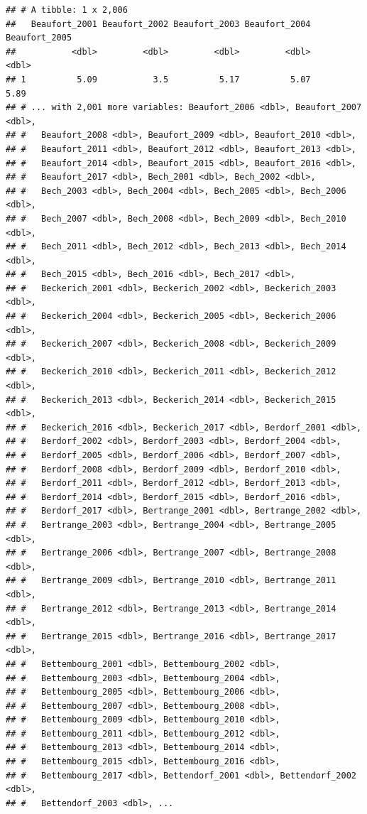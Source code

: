 \documentclass[]{gitbook}
\begin{document}
\begin{verbatim}
## # A tibble: 1 x 2,006
##   Beaufort_2001 Beaufort_2002 Beaufort_2003 Beaufort_2004 Beaufort_2005
##           <dbl>         <dbl>         <dbl>         <dbl>         <dbl>
## 1          5.09           3.5          5.17          5.07          5.89
## # ... with 2,001 more variables: Beaufort_2006 <dbl>, Beaufort_2007 <dbl>,
## #   Beaufort_2008 <dbl>, Beaufort_2009 <dbl>, Beaufort_2010 <dbl>,
## #   Beaufort_2011 <dbl>, Beaufort_2012 <dbl>, Beaufort_2013 <dbl>,
## #   Beaufort_2014 <dbl>, Beaufort_2015 <dbl>, Beaufort_2016 <dbl>,
## #   Beaufort_2017 <dbl>, Bech_2001 <dbl>, Bech_2002 <dbl>,
## #   Bech_2003 <dbl>, Bech_2004 <dbl>, Bech_2005 <dbl>, Bech_2006 <dbl>,
## #   Bech_2007 <dbl>, Bech_2008 <dbl>, Bech_2009 <dbl>, Bech_2010 <dbl>,
## #   Bech_2011 <dbl>, Bech_2012 <dbl>, Bech_2013 <dbl>, Bech_2014 <dbl>,
## #   Bech_2015 <dbl>, Bech_2016 <dbl>, Bech_2017 <dbl>,
## #   Beckerich_2001 <dbl>, Beckerich_2002 <dbl>, Beckerich_2003 <dbl>,
## #   Beckerich_2004 <dbl>, Beckerich_2005 <dbl>, Beckerich_2006 <dbl>,
## #   Beckerich_2007 <dbl>, Beckerich_2008 <dbl>, Beckerich_2009 <dbl>,
## #   Beckerich_2010 <dbl>, Beckerich_2011 <dbl>, Beckerich_2012 <dbl>,
## #   Beckerich_2013 <dbl>, Beckerich_2014 <dbl>, Beckerich_2015 <dbl>,
## #   Beckerich_2016 <dbl>, Beckerich_2017 <dbl>, Berdorf_2001 <dbl>,
## #   Berdorf_2002 <dbl>, Berdorf_2003 <dbl>, Berdorf_2004 <dbl>,
## #   Berdorf_2005 <dbl>, Berdorf_2006 <dbl>, Berdorf_2007 <dbl>,
## #   Berdorf_2008 <dbl>, Berdorf_2009 <dbl>, Berdorf_2010 <dbl>,
## #   Berdorf_2011 <dbl>, Berdorf_2012 <dbl>, Berdorf_2013 <dbl>,
## #   Berdorf_2014 <dbl>, Berdorf_2015 <dbl>, Berdorf_2016 <dbl>,
## #   Berdorf_2017 <dbl>, Bertrange_2001 <dbl>, Bertrange_2002 <dbl>,
## #   Bertrange_2003 <dbl>, Bertrange_2004 <dbl>, Bertrange_2005 <dbl>,
## #   Bertrange_2006 <dbl>, Bertrange_2007 <dbl>, Bertrange_2008 <dbl>,
## #   Bertrange_2009 <dbl>, Bertrange_2010 <dbl>, Bertrange_2011 <dbl>,
## #   Bertrange_2012 <dbl>, Bertrange_2013 <dbl>, Bertrange_2014 <dbl>,
## #   Bertrange_2015 <dbl>, Bertrange_2016 <dbl>, Bertrange_2017 <dbl>,
## #   Bettembourg_2001 <dbl>, Bettembourg_2002 <dbl>,
## #   Bettembourg_2003 <dbl>, Bettembourg_2004 <dbl>,
## #   Bettembourg_2005 <dbl>, Bettembourg_2006 <dbl>,
## #   Bettembourg_2007 <dbl>, Bettembourg_2008 <dbl>,
## #   Bettembourg_2009 <dbl>, Bettembourg_2010 <dbl>,
## #   Bettembourg_2011 <dbl>, Bettembourg_2012 <dbl>,
## #   Bettembourg_2013 <dbl>, Bettembourg_2014 <dbl>,
## #   Bettembourg_2015 <dbl>, Bettembourg_2016 <dbl>,
## #   Bettembourg_2017 <dbl>, Bettendorf_2001 <dbl>, Bettendorf_2002 <dbl>,
## #   Bettendorf_2003 <dbl>, ...
\end{verbatim}
\end{document}
